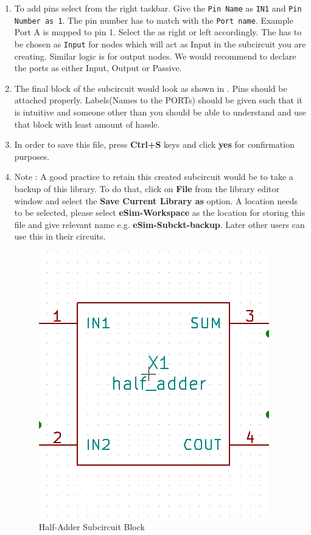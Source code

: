 \begin{itemize}
\begin{enumerate}
        \item To add pins select {} from the right taskbar. Give the {\tt Pin Name} as {\tt {IN1}} and {\tt{Pin Number as 1}}. The pin number has to match with the {\tt Port name}. Example Port A is mapped to pin 1. Select the {} as right or left accordingly. The {} has to be chosen as {\tt Input} for nodes which will act as Input in the subcircuit you are creating. Similar logic is for output nodes. We would recommend to declare the ports as either Input, Output or Passive.
        
        \item The final block of the subcircuit would look as shown in . Pins should be attached properly. Labels(Names to the PORTs) should be given such that it is intuitive and someone other than you should be able to understand and use that block with least amount of hassle.
        
        \item In order to save this file, press \textbf{Ctrl+S} keys and click \textbf{yes} for confirmation purposes. 
        
        \item Note : A good practice to retain this created subcircuit would be to take a backup of this library. To do that, click on \textbf{File} from the library editor window and select the \textbf{Save Current Library as} option. A location needs to be selected, please select \textbf{eSim-Workspace} as the location for storing this file and give relevant name e.g. \textbf{eSim-Subckt-backup}. Later other users can use this in their circuits.
        
        
                    \begin{figure}[!htp]
                        \centering
                        \includegraphics[width =\smfig]{halfadderblock.png}
                        \caption{Half-Adder Subcircuit Block}
                        \label{block}
                    \end{figure}
\end{enumerate}
        

\end{itemize}
